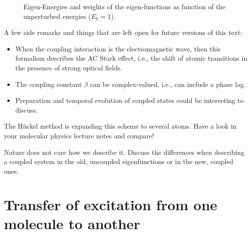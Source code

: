 \begin{figure}

\caption{Eigen-Energies and weights of the eigen-functions as function of the unperturbed energies ($E_b = 1$).}
\label{fig:aggregates_anticrossing}
\end{figure}

A few side remarks and things that are left open for future versions of this text: 
\begin{itemize} \setlength{\itemsep}{0pt}
    \item When the coupling interaction is the electromagnetic wave, then this formalism describes the AC Stark effect, i.e., the shift of atomic transitions in the presence of strong optical fields.
    \item The coupling constant $\beta$ can be complex-valued, i.e., can include a phase lag.
    \item Preparation and temporal evolution of coupled states could be interesting to discuss.
\end{itemize}


\begin{questions}
   \item The Hückel method is expanding this scheme to several atoms. Have a look in your molecular physics lecture notes and compare!
   \item Nature does not care how we describe it. Discuss the differences when describing a coupled system in the old, uncoupled  eigenfunctions or in the new, coupled ones.
\end{questions}

\section{Transfer of excitation from one molecule to another}

